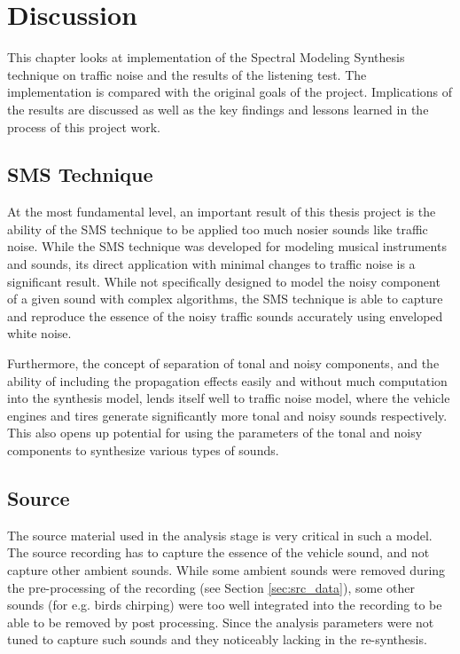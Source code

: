 \chapter{Discussion}
\label{cha:discussion}
This chapter looks at implementation of the Spectral Modeling Synthesis technique on traffic noise and the results of the listening test. The implementation is compared with the original goals of the project. Implications of the results are discussed as well as the key findings and lessons learned in the process of this project work.



\section{SMS Technique}
At the most fundamental level, an important result of this thesis project is the ability of the SMS technique to be applied too much nosier sounds like traffic noise. While the SMS technique was developed for modeling musical instruments and sounds, its direct application with minimal changes to traffic noise is a significant result. While not specifically designed to model the noisy component of a given sound with complex algorithms, the SMS technique is able to capture and reproduce the essence of the noisy traffic sounds accurately using enveloped white noise.

Furthermore, the concept of separation of tonal and noisy components, and the ability of including the propagation effects easily and without much computation into the synthesis model, lends itself well to traffic noise model, where the vehicle engines and tires generate significantly more tonal and noisy sounds respectively. This also opens up potential for using the parameters of the tonal and noisy components to synthesize various types of sounds.

\section{Source}
The source material used in the analysis stage is very critical in such a model. The source recording has to capture the essence of the vehicle sound, and not capture other ambient sounds. While some ambient sounds were removed during the pre-processing of the recording (see Section \ref{sec:src_data}), some other sounds (for e.g. birds chirping) were too well integrated into the recording to be able to be removed by post processing. Since the analysis parameters were not tuned to capture such sounds and they noticeably lacking in the re-synthesis.


